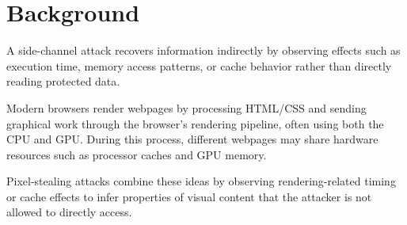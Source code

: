 \section{Background}
\label{sec:background}

A side-channel attack recovers information indirectly by observing effects such as execution time, memory access patterns, or cache behavior rather than directly reading protected data.

Modern browsers render webpages by processing HTML/CSS and sending graphical work through the browser's rendering pipeline, often using both the CPU and GPU. During this process, different webpages may share hardware resources such as processor caches and GPU memory.

Pixel-stealing attacks combine these ideas by observing rendering-related timing or cache effects to infer properties of visual content that the attacker is not allowed to directly access.